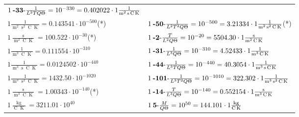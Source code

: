\begin{center}
\begin{longtable}{l l}
	{\color{black}$1\:\text{\textbf{-33}-} \frac1{L^2TQ\Theta}=10^{-330} = 0.402022 \cdot 1 \bm{\mathrm{ }}\frac1{\operatorname{m}^2\operatorname{s}\operatorname{C}\operatorname{K}}$}\\
{\color{black}$1 \bm{\mathrm{ }}\frac1{\operatorname{m}^2\operatorname{s}^2\operatorname{C}\operatorname{K}} = 0.143541\cdot10^{-500} $}\quad(*)&
	{\color{black}$1\:\text{\textbf{-50}-} \frac1{L^2T^2Q\Theta}=10^{-500} = 3.21334 \cdot 1 \bm{\mathrm{ }}\frac1{\operatorname{m}^2\operatorname{s}^2\operatorname{C}\operatorname{K}}$}\quad(*)\\
{\color{black}$1 \bm{\mathrm{ }}\frac{\operatorname{s}}{\operatorname{m}^2\operatorname{C}\operatorname{K}} = 100.522\cdot10^{-30} $}\quad(*)&
	{\color{black}$1\:\text{\textbf{-2}-} \frac{T}{L^2Q\Theta}=10^{-20} = 5504.30 \cdot 1 \bm{\mathrm{ }}\frac{\operatorname{s}}{\operatorname{m}^2\operatorname{C}\operatorname{K}}$}\\
{\color{black}$1 \bm{\mathrm{ }}\frac1{\operatorname{m}^3\operatorname{C}\operatorname{K}} = 0.111554\cdot10^{-310} $}&
	{\color{black}$1\:\text{\textbf{-31}-} \frac1{L^3Q\Theta}=10^{-310} = 4.52433 \cdot 1 \bm{\mathrm{ }}\frac1{\operatorname{m}^3\operatorname{C}\operatorname{K}}$}\\
{\color{black}$1 \bm{\mathrm{ }}\frac1{\operatorname{m}^3\operatorname{s}\operatorname{C}\operatorname{K}} = 0.0124502\cdot10^{-440} $}&
	{\color{black}$1\:\text{\textbf{-44}-} \frac1{L^3TQ\Theta}=10^{-440} = 40.3054 \cdot 1 \bm{\mathrm{ }}\frac1{\operatorname{m}^3\operatorname{s}\operatorname{C}\operatorname{K}}$}\\
{\color{black}$1 \bm{\mathrm{ }}\frac1{\operatorname{m}^3\operatorname{s}^2\operatorname{C}\operatorname{K}} = 1432.50\cdot10^{-1020} $}&
	{\color{black}$1\:\text{\textbf{-101}-} \frac1{L^3T^2Q\Theta}=10^{-1010} = 322.302 \cdot 1 \bm{\mathrm{ }}\frac1{\operatorname{m}^3\operatorname{s}^2\operatorname{C}\operatorname{K}}$}\\
{\color{black}$1 \bm{\mathrm{ }}\frac{\operatorname{s}}{\operatorname{m}^3\operatorname{C}\operatorname{K}} = 1.00343\cdot10^{-140} $}\quad(*)&
	{\color{black}$1\:\text{\textbf{-14}-} \frac{T}{L^3Q\Theta}=10^{-140} = 0.552154 \cdot 1 \bm{\mathrm{ }}\frac{\operatorname{s}}{\operatorname{m}^3\operatorname{C}\operatorname{K}}$}\\
\hline{\color{black}$1 \bm{\mathrm{ }}\frac{\operatorname{kg}}{\operatorname{C}\operatorname{K}} = 3211.01\cdot10^{40} $}&
	{\color{black}$1\:\text{\textbf{5}-} \frac{M}{Q\Theta}=10^{50} = 144.101 \cdot 1 \bm{\mathrm{ }}\frac{\operatorname{kg}}{\operatorname{C}\operatorname{K}}$}\\

\end{longtable}
\end{center}
